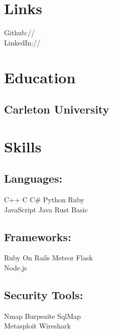 \documentclass[]{deedy-resume-openfont}
\begin{document}
%
%
\begin{minipage}[t]{0.33\textwidth} 
\section{Links} 
Github:// \href{https://github.com/angelonfira}{} \\
LinkedIn://  \href{https://www.linkedin.com/in/forest-anderson}{}
\sectionsep
\section{Education} 
\subsection{Carleton University}
\sectionsep
\section{Skills}
\subsection{Languages:}
C++ \textbullet{} C \textbullet{} C\# \textbullet{} Python \textbullet{} Ruby \\
JavaScript \textbullet{} Java \textbullet{} Rust \textbullet{} Basic\\
\sectionsep
\subsection{Frameworks:}
Ruby On Rails \textbullet{} Meteor \textbullet{} Flask \\
Node.js \\
\sectionsep
\subsection{Security Tools:}
Nmap \textbullet{} Burpsuite \textbullet{} SqlMap\\
Metasploit \textbullet{} Wireshark \\
\sectionsep

\end{minipage}
\end{document}
